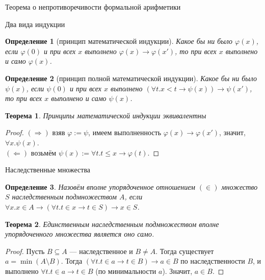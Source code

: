 \documentclass[aspectratio=169]{beamer}
\newtheorem{thm}{Теорема}[section]
\newtheorem{dfn}{Определение}[section]
\begin{document}
\newcommand\doubleplus{+\kern-1.3ex+\kern0.8ex}
\newcommand\mdoubleplus{\ensuremath{\mathbin{+\mkern-10mu+}}}

\begin{frame}{}
\LARGE\begin{center}Теорема о непротиворечивости формальной арифметики\end{center}
\end{frame}

\begin{frame}{Два вида индукции}
\begin{dfn}[принцип математической индукции]
Какое бы ни было $\varphi(x)$, если $\varphi(0)$ и при всех $x$ выполнено $\varphi(x)\rightarrow \varphi(x')$, то
при всех $x$ выполнено и само $\varphi(x)$.
\end{dfn}

\begin{dfn}[принцип полной математической индукции]
Какое бы ни было $\psi(x)$, если $\psi(0)$ и при всех $x$ выполнено $(\forall t.x < t \rightarrow \psi(x))\rightarrow \psi(x')$, то
при всех $x$ выполнено и само $\psi(x)$.
\end{dfn}

\begin{thm}Принципы математической индукции эквивалентны\end{thm}
\begin{proof}
$(\Rightarrow)$ взяв $\varphi := \psi$, имеем выполненность $\varphi(x)\rightarrow\varphi(x')$, значит, $\forall x.\psi(x)$. \pause\\
$(\Leftarrow)$ возьмём $\psi(x) := \forall t.t\le x\rightarrow\varphi(t)$.
\end{proof}
\end{frame}

\begin{frame}{Наследственные множества}
\begin{dfn} Назовём вполне упорядоченное отношением $(\in)$ множество $S$ наследственным подмножеством $A$, если 
$\forall x.x \in A \rightarrow (\forall t.t \in x \rightarrow t \in S) \rightarrow x \in S$.
\end{dfn}
\begin{thm}Единственным наследственным подмножеством вполне упорядоченного множества является оно само.\end{thm}
\begin{proof}Пусть $B \subseteq A$ --- наследственное и $B \ne A$.
Тогда существует $a = \min (A \setminus B)$. Тогда $(\forall t.t \in a \rightarrow t \in B) \rightarrow a \in B$ по наследственности $B$,
и выполнено $\forall t.t \in a \rightarrow t \in B$ (по минимальности $a$). Значит, $a \in B$.
\end{proof}
\end{frame}
\end{document}
